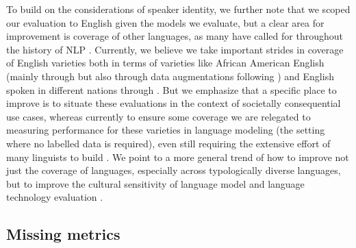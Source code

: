 To build on the considerations of speaker identity, we further note that we scoped our evaluation to English given the models we evaluate, but a clear area for improvement is coverage of other languages, as many have called for throughout the history of NLP \citep[\eg][]{bender2009linguistically, bender2011achieving, bender2012100, joshi2020state}.
Currently, we believe we take important strides in coverage of English varieties both in terms of varieties like African American English (mainly through \twitteraae but also through data augmentations following \citet{ziems2022value}) and English spoken in different nations through \ice. 
But we emphasize that a specific place to improve is to situate these evaluations in the context of societally consequential use cases, whereas currently to ensure some coverage we are relegated to measuring performance for these varieties in language modeling (\ie the setting where no labelled data is required), even still requiring the extensive effort of many linguists to build \ice. 
We point to a more general trend of how to improve not just the coverage of languages, especially across typologically diverse languages, but to improve the cultural sensitivity of language model and language technology evaluation \citep{hershcovich2022challenges}. 


\subsection{Missing metrics}
\label{sec:missing-metrics}

